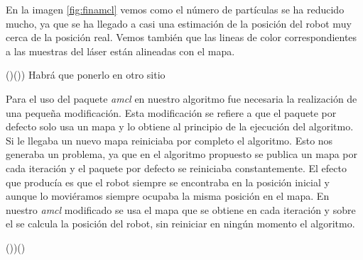 En la imagen \ref{fig:finamcl} vemos como el número de partículas se ha reducido mucho, ya que se ha llegado a casi una estimación de la posición del robot muy cerca de la posición real. Vemos también que las lineas de color correspondientes a las muestras del láser están alineadas con el mapa.

()()) Habrá que ponerlo en otro sitio

Para el uso del paquete \textit{amcl} en nuestro algoritmo fue necesaria la realización de una pequeña modificación. Esta modificación se refiere a que el paquete por defecto solo usa un mapa y lo obtiene al principio de la ejecución del algoritmo. Si le llegaba un nuevo mapa reiniciaba por completo el algoritmo. Esto nos generaba un problema, ya que en el algoritmo propuesto se publica un mapa por cada iteración y el paquete por defecto se reiniciaba constantemente. El efecto que producía es que el robot siempre se encontraba en la posición inicial y aunque lo moviéramos siempre ocupaba la misma posición en el mapa. En nuestro \textit{amcl} modificado se usa el mapa que se obtiene en cada iteración y sobre el se calcula la posición del robot, sin reiniciar en ningún momento el algoritmo.

())()

